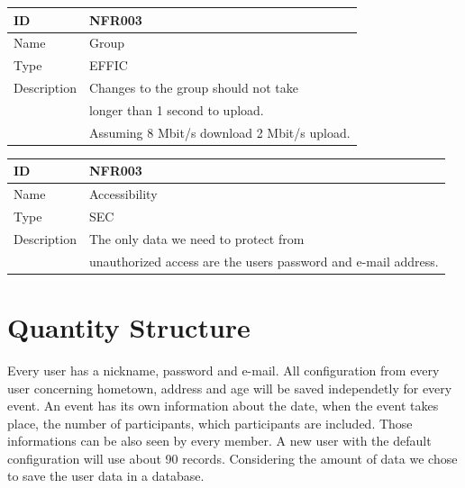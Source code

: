 \documentclass[12pt]{article}
\theoremstyle{definition}
\begin{document}
\vspace*{1 cm}

\begin{flushleft}
  \begin{tabular}{|l|l|}
  \hline
  ID &  NFR003\\ \hline
  Name & Group \\ \hline
  Type &  EFFIC\\ \hline
  Description & Changes to the group should not take \\
  & longer than 1 second to upload. \\ 
  & Assuming 8 Mbit/s download 2 Mbit/s upload. \\ \hline
  \end{tabular}
\end{flushleft}

\vspace*{1 cm}

\begin{flushleft}
  \begin{tabular}{|l|l|}
  \hline
  ID &  NFR003\\ \hline
  Name & Accessibility \\ \hline
  Type &  SEC \\ \hline
  Description & The only data we need to protect from \\
  & unauthorized access are the users password and e-mail address. \\ \hline
  \end{tabular}
\end{flushleft}


\pagebreak

\section{Quantity Structure}
Every user has a nickname, password and e-mail. All configuration from every user concerning hometown, address and age will be saved independetly for every event. An event has its
own information about the date, when the event takes place, the number of participants, which participants are included. Those informations can be also seen by every member. A new user with the default configuration will use about 90 records. Considering the amount of data we chose to save the user data in a database. 

\pagebreak
\end{document}
